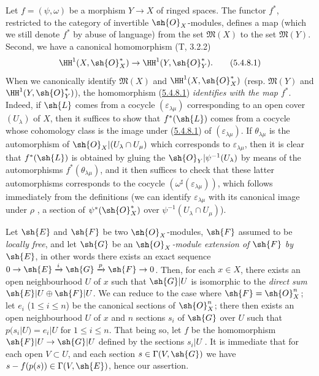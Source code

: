 \begin{env}[5.4.8]
\label{0.5.4.8}
Let $f=(\psi,\omega)$ be a morphism $Y\to X$ of ringed spaces.
The functor $f^*$, restricted to the category of invertible $\sh{O}_X$-modules, defines a map (which we still denote $f^*$ by abuse of language) from the set $\mathfrak{M}(X)$ to the set $\mathfrak{M}(Y)$.
Second, we have a canonical homomorphism (T, 3.2.2)
\[
  \HH^1(X,\sh{O}_X^*)\to\HH^1(Y,\sh{O}_Y^*).
  \tag{5.4.8.1}\label{0.5.4.8.1}
\]
When we canonically identify  $\mathfrak{M}(X)$ and $\HH^1(X,\sh{O}_X^*)$ (resp. $\mathfrak{M}(Y)$ and $\HH^1(Y,\sh{O}_Y^*)$), the homomorphism (\hyperref[0.5.4.8.1]{5.4.8.1}) \emph{identifies with the map $f^*$}.
Indeed, if $\sh{L}$ comes from a cocycle $(\varepsilon_{\lambda\mu})$ corresponding to an open cover $(U_\lambda)$ of $X$, then it suffices to show that $f^*(\sh{L})$ comes from a cocycle whose cohomology class is the image under (\hyperref[0.5.4.8.1]{5.4.8.1}) of $(\varepsilon_{\lambda\mu})$.
If $\theta_{\lambda\mu}$ is the automorphism of $\sh{O}_X|(U_\lambda\cap U_\mu)$ which corresponds to $\varepsilon_{\lambda\mu}$, then it is clear that $f^*(\sh{L})$ is obtained by gluing the $\sh{O}_Y|\psi^{-1}(U_\lambda)$ by means of the automorphisms $f^*(\theta_{\lambda\mu})$, and it then suffices to check that these latter automorphisms corresponds to the cocycle $(\omega^\sharp(\varepsilon_{\lambda\mu}))$, which follows immediately from the definitions (we can identify $\varepsilon_{\lambda\mu}$ with its canonical image under $\rho$ , a section of $\psi^*(\sh{O}_X^*)$ over $\psi^{-1}(U_\lambda\cap U_\mu)$).
\end{env}

\begin{env}[5.4.9]
\label{0.5.4.9}
Let $\sh{E}$ and $\sh{F}$ be two $\sh{O}_X$-modules, $\sh{F}$ assumed to be \emph{locally free}, and let $\sh{G}$ be an \emph{$\sh{O}_X$-module extension of $\sh{F}$ by $\sh{E}$}, in other words there exists an exact sequence $0\to\sh{E}\xrightarrow{i}\sh{G}\xrightarrow{p}\sh{F}\to 0$.
Then, for each $x\in X$, there exists an open neighbourhood $U$ of $x$ such that $\sh{G}|U$ is isomorphic to the \emph{direct sum $\sh{E}|U\oplus\sh{F}|U$}.
We can reduce to the case where $\sh{F}=\sh{O}_X^n$; let $e_i$ ($1\leq i\leq n$) be the canonical sections  of $\sh{O}_X^n$; there then exists an open neighbourhood $U$ of $x$ and $n$ sections $s_i$ of $\sh{G}$ over $U$ such that $p(s_i|U)=e_i|U$ for $1\leq i\leq n$.
That being so, let $f$ be the homomorphism $\sh{F}|U\to\sh{G}|U$ defined by the sections $s_i|U$ .
It is immediate that for each open $V\subset U$, and each section $s\in\Gamma(V,\sh{G})$ we have $s-f(p(s))\in\Gamma(V,\sh{E})$, hence our assertion.
\end{env}

